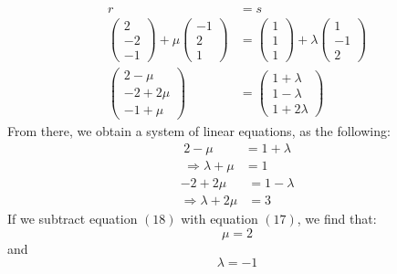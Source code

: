 \documentclass[hidelinks, a4paper, 12pt]{article}
\newcommand{\thus}{\Rightarrow}
\begin{document}
            \[\begin{split}
                r &= s\\
                \begin{pmatrix} 2 \\ -2 \\ -1 \end{pmatrix} + \mu\begin{pmatrix} -1 \\ 2 \\ 1 \end{pmatrix} &= \begin{pmatrix} 1 \\ 1 \\ 1 \end{pmatrix} + \lambda \begin{pmatrix} 1 \\ -1 \\ 2 \end{pmatrix}\\
                \begin{pmatrix} 2 - \mu \\ -2 + 2\mu \\ -1 + \mu\end{pmatrix} &= \begin{pmatrix} 1 + \lambda \\ 1  - \lambda\\ 1 + 2\lambda \end{pmatrix}    
            \end{split}\]
            From there, we obtain a system of linear equations, as the following:
            \begin{equation}
                \begin{split}
                    2 - \mu &= 1 + \lambda\\
                    \thus \lambda + \mu &= 1
                \end{split}
            \end{equation}
            \begin{equation}
                \begin{split}
                    -2 + 2\mu &= 1  - \lambda\\
                    \thus \lambda + 2\mu &= 3
                \end{split}
            \end{equation}
            If we subtract equation $(18)$ with equation $(17)$, we find that:
            \[\mu = 2\]
            and
            \[\lambda = -1\]
\end{document}

